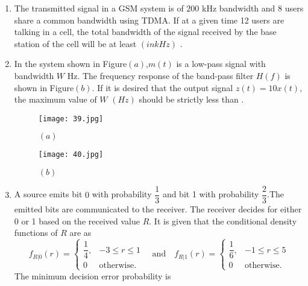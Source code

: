 \documentclass[12pt,-letter paper]{article}
\providecommand{\brak}[1]{\ensuremath{\left(#1\right)}}
\theoremstyle{remark}
\begin{document}
\begin{enumerate}
 \item The transmitted signal in a GSM system is of $200$ kHz bandwidth and 8 users share a common bandwidth using TDMA. If at a given time 12 users are talking in a cell, the total bandwidth of the signal received by the base station of the cell will be at least \brak{in kHz} \underline{\hspace{2cm}}.
 \item In the system shown in Figure\brak{a},$m\brak{t}$ is a low-pass signal with bandwidth $W$ Hz. The frequency response of the band-pass filter $H\brak{f}$ is shown in Figure\brak{b}. If it is desired that the output signal $z\brak{t}=10x\brak{t}$,  the maximum value of $W$ \brak{Hz}
should be strictly less than \underline{\hspace{1cm}}.
    \begin{figure}[H]
        \centering
        \texttt{[image: 39.jpg]}
        \caption{\brak{a}}
    \end{figure}
    \vspace{0pt}
    \begin{figure}[H]
        \centering
        \texttt{[image: 40.jpg]}
        \caption{\brak{b}}
    \end{figure}
 \item A source emits bit $0$ with probability $\dfrac{1}{3}$ and bit 1 with probability $\dfrac{2}{3}$.The emitted bits are communicated to the receiver. The receiver decides for either 0 or 1 based on the received value 
$R$. It is given that the conditional density functions of $R$ are as 
  \[f_{R|0}\brak{r}=     \begin{cases}
       \dfrac{1}{4}, & -3\leq r\leq 1 \\
       0 & \text{otherwise.} 
     \end{cases} \quad \text{and} \quad f_{R|1}\brak{r} = \begin{cases}
       \dfrac{1}{6}, & -1\leq r\leq 5 \\
       0 & \text{otherwise.} 
     \end{cases}\] 
     The minimum decision error probability is
 \\ \\ 
\end{enumerate}
\end{document}
